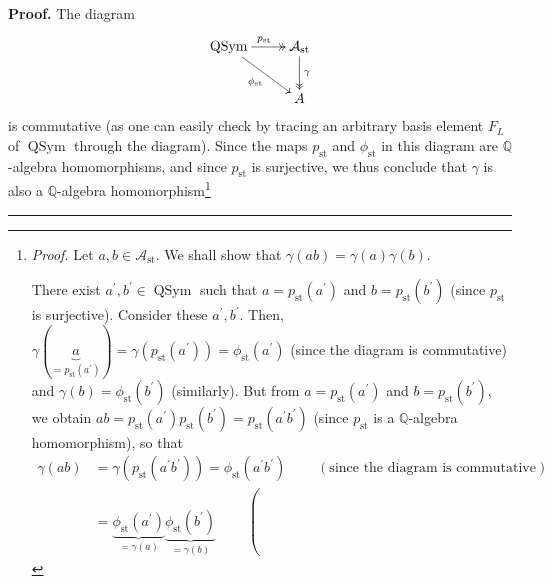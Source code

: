 \documentclass[numbers=enddot,12pt,final,onecolumn,notitlepage]{scrartcl}%
\makeatletter
\theoremstyle{definition}
\newenvironment{proof}[1][Proof]{\noindent\textbf{#1.} }{\ \rule{0.5em}{0.5em}}
\newenvironment{verlong}{}{}
\newcommand{\QSym}{\operatorname{QSym}}
\newcommand{\arsurj}{\ar@{->>}}
\makeatother
\begin{document}
\begin{verlong}
\begin{proof}
The diagram%
\[%
\xymatrix{
\QSym\arsurj[r]^{p_{\operatorname{st}}} \ar[dr]_{\phi_{\operatorname{st}}}
& \mathcal{A}_{\operatorname{st}} \arsurj[d]^\gamma\\
& A
}%
\]
is commutative (as one can easily check by tracing an arbitrary basis element
$F_{L}$ of $\operatorname*{QSym}$ through the diagram). Since the maps
$p_{\operatorname{st}}$ and $\phi_{\operatorname{st}}$ in this diagram are
$\mathbb{Q}$-algebra homomorphisms, and since $p_{\operatorname{st}}$ is
surjective, we thus conclude that $\gamma$ is also a $\mathbb{Q}$-algebra
homomorphism\footnote{\textit{Proof.} Let $a,b\in\mathcal{A}%
_{\operatorname{st}}$. We shall show that $\gamma\left(  ab\right)
=\gamma\left(  a\right)  \gamma\left(  b\right)  $.
\par
There exist $a^{\prime},b^{\prime}\in\operatorname*{QSym}$ such that
$a=p_{\operatorname{st}}\left(  a^{\prime}\right)  $ and
$b=p_{\operatorname{st}}\left(  b^{\prime}\right)  $ (since
$p_{\operatorname{st}}$ is surjective). Consider these $a^{\prime},b^{\prime
}$. Then, $\gamma\left(  \underbrace{a}_{=p_{\operatorname{st}}\left(
a^{\prime}\right)  }\right)  =\gamma\left(  p_{\operatorname{st}}\left(
a^{\prime}\right)  \right)  =\phi_{\operatorname{st}}\left(  a^{\prime
}\right)  $ (since the diagram is commutative) and $\gamma\left(  b\right)
=\phi_{\operatorname{st}}\left(  b^{\prime}\right)  $ (similarly). But from
$a=p_{\operatorname{st}}\left(  a^{\prime}\right)  $ and
$b=p_{\operatorname{st}}\left(  b^{\prime}\right)  $, we obtain
$ab=p_{\operatorname{st}}\left(  a^{\prime}\right)  p_{\operatorname{st}%
}\left(  b^{\prime}\right)  =p_{\operatorname{st}}\left(  a^{\prime}%
b^{\prime}\right)  $ (since $p_{\operatorname{st}}$ is a $\mathbb{Q}$-algebra
homomorphism), so that%
\begin{align*}
\gamma\left(  ab\right)   &  =\gamma\left(  p_{\operatorname{st}}\left(
a^{\prime}b^{\prime}\right)  \right)  =\phi_{\operatorname{st}}\left(
a^{\prime}b^{\prime}\right)  \ \ \ \ \ \ \ \ \ \ \left(  \text{since the
diagram is commutative}\right) \\
&  =\underbrace{\phi_{\operatorname{st}}\left(  a^{\prime}\right)  }%
_{=\gamma\left(  a\right)  }\underbrace{\phi_{\operatorname{st}}\left(
b^{\prime}\right)  }_{=\gamma\left(  b\right)  }\ \ \ \ \ \ \ \ \ \ \left(

\end{align*}}
\end{proof}
\end{verlong}
\end{document}
